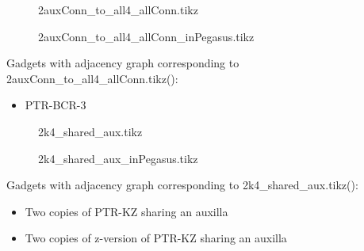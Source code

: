 \documentclass{article}
\begin{document}
\begin{figure}

\caption{2auxConn\_to\_all4\_allConn.tikz}
\end{figure}

\begin{figure}

\caption{2auxConn\_to\_all4\_allConn\_inPegasus.tikz}
\end{figure}

Gadgets with adjacency graph corresponding to 2auxConn\_to\_all4\_allConn.tikz(\scalebox{.25}{}):

\begin{itemize}
\item PTR-BCR-3
\end{itemize}

\begin{figure}

\caption{2k4\_shared\_aux.tikz}
\end{figure}

\begin{figure}

\caption{2k4\_shared\_aux\_inPegasus.tikz}
\end{figure}

Gadgets with adjacency graph corresponding to 2k4\_shared\_aux.tikz(\scalebox{.25}{}):

\begin{itemize}
\item Two copies of PTR-KZ sharing an auxilla
\item Two copies of z-version of PTR-KZ sharing an auxilla
\end{itemize}
\end{document}
